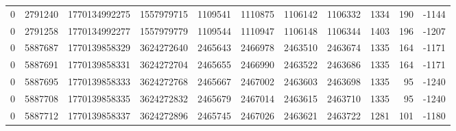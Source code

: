 \begin{tabular}{rrrrrrrrrrr}
0 & 2791240 & 1770134992275 & 1557979715 & 1109541 & 1110875 & 1106142 & 1106332 & 1334 & 190 & -1144 \\
0 & 2791258 & 1770134992277 & 1557979779 & 1109544 & 1110947 & 1106148 & 1106344 & 1403 & 196 & -1207 \\
0 & 5887687 & 1770139858329 & 3624272640 & 2465643 & 2466978 & 2463510 & 2463674 & 1335 & 164 & -1171 \\
0 & 5887691 & 1770139858331 & 3624272704 & 2465655 & 2466990 & 2463522 & 2463686 & 1335 & 164 & -1171 \\
0 & 5887695 & 1770139858333 & 3624272768 & 2465667 & 2467002 & 2463603 & 2463698 & 1335 & 95 & -1240 \\
0 & 5887708 & 1770139858335 & 3624272832 & 2465679 & 2467014 & 2463615 & 2463710 & 1335 & 95 & -1240 \\
0 & 5887712 & 1770139858337 & 3624272896 & 2465745 & 2467026 & 2463621 & 2463722 & 1281 & 101 & -1180 \\
\bottomrule
\end{tabular}
